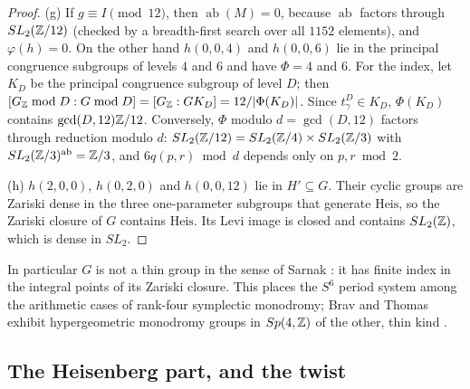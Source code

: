 \begin{proof}
(g) If $g\equiv I\pmod{12}$, then $\operatorname{ab}(M)=0$, because $\operatorname{ab}$ factors through $SL_2(\mathbb{Z}/12)$ (checked by a breadth-first search over all $1152$ elements), and $\varphi(h)=0$. On the other hand $h(0,0,4)$ and $h(0,0,6)$ lie in the principal congruence subgroups of levels $4$ and $6$ and have $\Phi=4$ and $6$. For the index, let $K_D$ be the principal congruence subgroup of level $D$; then $[G_{\mathbb{Z}}\bmod D:G\bmod D]=[G_{\mathbb{Z}}:GK_D]=12/|\Phi(K_D)|$. Since $t_\gamma^D\in K_D$, $\Phi(K_D)$ contains $\gcd(D,12)\mathbb{Z}/12$. Conversely, $\Phi$ modulo $d=\gcd(D,12)$ factors through reduction modulo $d$: $SL_2(\mathbb{Z}/12)=SL_2(\mathbb{Z}/4)\times SL_2(\mathbb{Z}/3)$ with $SL_2(\mathbb{Z}/3)^{\mathrm{ab}}=\mathbb{Z}/3$, and $6q(p,r)\bmod d$ depends only on $p,r\bmod2$.

(h) $h(2,0,0)$, $h(0,2,0)$ and $h(0,0,12)$ lie in $H'\subseteq G$. Their cyclic groups are Zariski dense in the three one-parameter subgroups that generate $\mathrm{Heis}$, so the Zariski closure of $G$ contains $\mathrm{Heis}$. Its Levi image is closed and contains $SL_2(\mathbb{Z})$, which is dense in $SL_2$.
\end{proof}

In particular $G$ is not a thin group in the sense of Sarnak \cite{SarnakThin}: it has finite index in the integral points of its Zariski closure. This places the $S^6$ period system among the arithmetic cases of rank-four symplectic monodromy; Brav and Thomas exhibit hypergeometric monodromy groups in $Sp(4,\mathbb{Z})$ of the other, thin kind \cite{BravThomas}.

\subsection{The Heisenberg part, and the twist}

